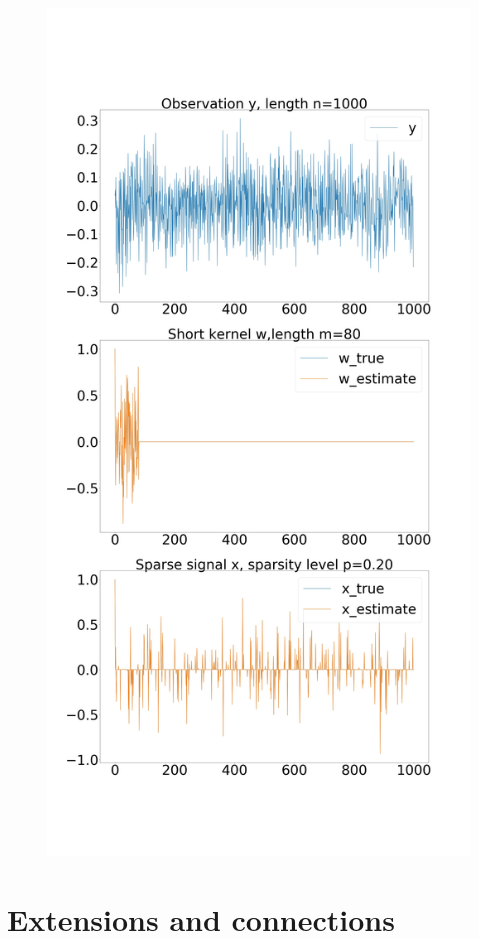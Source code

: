 \documentclass[12pt]{article}
\begin{document}
\begin{figure}
 \includegraphics[width=12cm,keepaspectratio]{figures/bShort_lenKnown_xSparse_w_Gaus_Ano_n1000_k80_p0_20_sigma0_00.jpg}
\end{figure}
 
\section{Extensions and connections}
\end{document}
